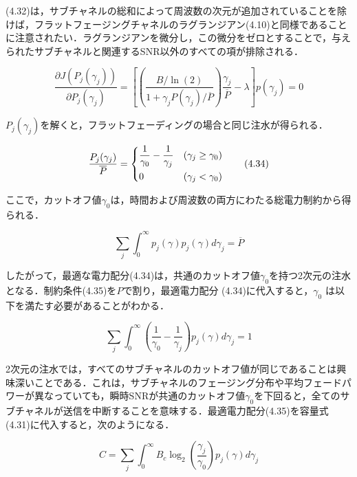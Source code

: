 \documentclass[dvipdfmx]{jsarticle}
\begin{document}
\noindent
(4.32)は，サブチャネルの総和によって周波数の次元が追加されていることを除けば，フラットフェージングチャネルのラグランジアン(4.10)と同様であることに注意されたい．ラグランジアンを微分し，この微分をゼロとすることで，与えられたサブチャネルと関連するSNR以外のすべての項が排除される．

\begin{equation}\label{}
\frac{\partial{J}(P_j(\gamma_j))}{\partial{P_j}(\gamma_j)} = \left[(\frac{B / \ln(2)}{1 + \gamma_j P(\gamma_j) / \overline{P}}) \frac{\gamma_j}{\overline{P}} - \lambda \right] p(\gamma_j) = 0
\tag{4.33}
\end{equation}

\noindent
$P_j(\gamma_j)$を解くと，フラットフェーディングの場合と同じ注水が得られる．

\begin{equation}
    \frac{P_j(\gamma_j)}{\overline{P}} =
    \begin{dcases}
    \frac{1}{\gamma_0} - \frac{1}{\gamma_j} & (\gamma_j \geq \gamma_0) \\
    0 & (\gamma_j < \gamma_0)
    \end{dcases}
\tag{4.34}
\end{equation}

\noindent
ここで，カットオフ値$\gamma_0$は，時間および周波数の両方にわたる総電力制約から得られる．

\begin{equation}\label{}
\sum_j \int_{0}^{\infty} p_j (\gamma) p_j (\gamma) d\gamma_j = \overline{P}
\tag{4.35}
\end{equation}

\noindent
したがって，最適な電力配分(4.34)は，共通のカットオフ値$\gamma_0$を持つ2次元の注水となる．制約条件(4.35)を$P$で割り，最適電力配分 (4.34)に代入すると，$\gamma_0$ は以下を満たす必要があることがわかる．

\begin{equation}\label{}
    \sum_j \int_{0}^{\infty} \left(\frac{1}{\gamma_0} - \frac{1}{\gamma_j}\right) p_j (\gamma) d\gamma_j = 1
\tag{4.36}
\end{equation}

\noindent
2次元の注水では，すべてのサブチャネルのカットオフ値が同じであることは興味深いことである．これは，サブチャネルのフェージング分布や平均フェードパワーが異なっていても，瞬時SNRが共通のカットオフ値$\gamma_0$を下回ると，全てのサブチャネルが送信を中断することを意味する．最適電力配分(4.35)を容量式(4.31)に代入すると，次のようになる．

\begin{equation}\label{}
    C = \sum_j \int_{0}^{\infty} B_c \log_2 \left(\frac{\gamma_j}{\gamma_0}\right) p_j (\gamma) d\gamma_j
\tag{4.37}
\end{equation}
\end{document}
